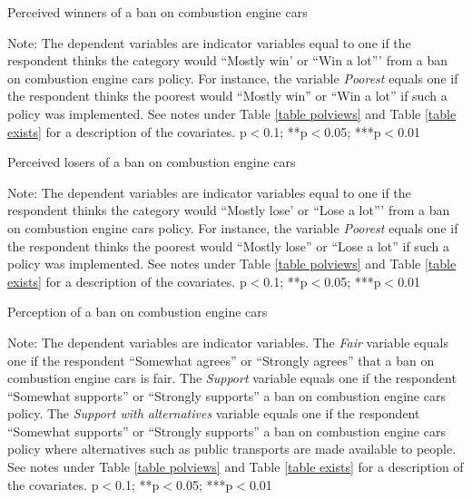\documentclass{article}
\begin{document}
\begin{table}[h!]
	\caption{Perceived winners of a ban on combustion engine cars}
	\begin{center}
		\scalebox{0.7}{}
	\end{center}
	{\footnotesize Note: The dependent variables are indicator variables equal to one if the respondent thinks the category would ``Mostly win' or ``Win a lot''' from a ban on combustion engine cars policy. For instance, the variable \textit{Poorest} equals one if the respondent thinks the poorest would ``Mostly win'' or ``Win a lot'' if such a policy was implemented. See notes under Table \ref{table polviews} and Table \ref{table exists} for a description of the covariates.
	\newline *p$<$0.1; **p$<$0.05; ***p$<$0.01}
\end{table}	

\begin{table}[h!]
	\caption{Perceived losers of a ban on combustion engine cars}
	\begin{center}
		\scalebox{0.7}{}
	\end{center}
	{\footnotesize Note: The dependent variables are indicator variables equal to one if the respondent thinks the category would ``Mostly lose' or ``Lose a lot''' from a ban on combustion engine cars policy. For instance, the variable \textit{Poorest} equals one if the respondent thinks the poorest would ``Mostly lose'' or ``Lose a lot'' if such a policy was implemented. See notes under Table \ref{table polviews} and Table \ref{table exists} for a description of the covariates.
	\newline *p$<$0.1; **p$<$0.05; ***p$<$0.01}
\end{table}	


\begin{table}[h!]
	\caption{Perception of a ban on combustion engine cars}
	\begin{center}
		\scalebox{0.7}{}
	\end{center}
	{\footnotesize Note: The dependent variables are indicator variables. The \textit{Fair} variable equals one if the respondent ``Somewhat agrees'' or ``Strongly agrees'' that a ban on combustion engine cars is fair. The \textit{Support} variable equals one if the respondent ``Somewhat supports'' or ``Strongly supports'' a ban on combustion engine cars policy. The \textit{Support with alternatives} variable equals one if the respondent ``Somewhat supports'' or ``Strongly supports'' a ban on combustion engine cars policy where alternatives such as public transports are made available to people.  See notes under Table \ref{table polviews} and Table \ref{table exists} for a description of the covariates.
	\newline *p$<$0.1; **p$<$0.05; ***p$<$0.01}
\end{table}	
\end{document}
